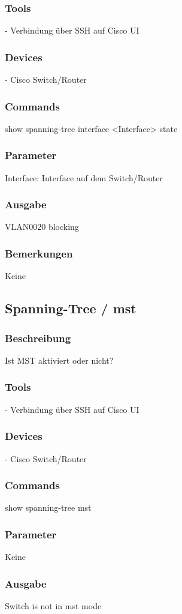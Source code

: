 \documentclass[a4,12pt]{scrartcl}
\begin{document}
\subsubsection{Tools}
- Verbindung über SSH auf Cisco UI 
\subsubsection{Devices}
- Cisco Switch/Router
\subsubsection{Commands}
show spanning-tree interface <Interface> state
\subsubsection{Parameter}
Interface: Interface auf dem Switch/Router
\subsubsection{Ausgabe}
VLAN0020            blocking
\subsubsection{Bemerkungen}
Keine

\subsection{Spanning-Tree / mst}
\subsubsection{Beschreibung}
Ist MST aktiviert oder nicht?
\subsubsection{Tools}
- Verbindung über SSH auf Cisco UI
\subsubsection{Devices}
- Cisco Switch/Router
\subsubsection{Commands}
show spanning-tree mst
\subsubsection{Parameter}
Keine
\subsubsection{Ausgabe}
Switch is not in mst mode
\end{document}
